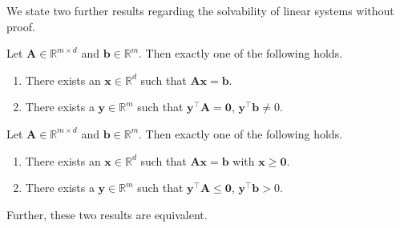 We state two further results regarding the solvability of linear systems without proof. 

\begin{thm}[Gauss]
    Let $\mathbf{A} \in \mathbb{R}^{m \times d}$ and $\mathbf{b} \in \mathbb{R}^m$. Then exactly one of the following holds. 

    \begin{enumerate}
        \item There exists an $\mathbf{x} \in \mathbb{R}^d$ such that $\mathbf{Ax} = \mathbf{b}$.
        \item There exists a $\mathbf{y} \in \mathbb{R}^m$ such that $\mathbf{y}^{\top}\mathbf{A} = \mathbf{0}$, $\mathbf{y}^{\top}\mathbf{b} \neq 0$.
    \end{enumerate}
\end{thm}

\begin{lem}
    Let $\mathbf{A} \in \mathbb{R}^{m \times d}$ and $\mathbf{b} \in \mathbb{R}^m$. Then exactly one of the following holds. 

    \begin{enumerate}
        \item There exists an $\mathbf{x} \in \mathbb{R}^d$ such that $\mathbf{Ax} = \mathbf{b}$ with $\mathbf{x} \geq \mathbf{0}$.
        \item There exists a $\mathbf{y} \in \mathbb{R}^m$ such that $\mathbf{y}^{\top}\mathbf{A} \leq \mathbf{0}$, $\mathbf{y}^{\top}\mathbf{b} > 0$.
    \end{enumerate}
\end{lem}

Further, these two results are equivalent. 